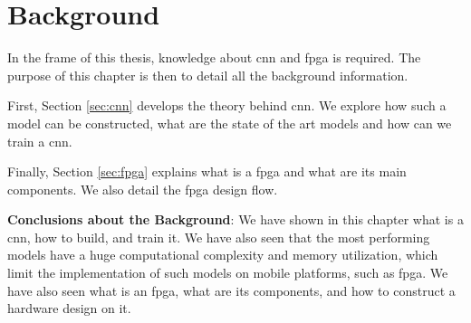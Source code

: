 \chapter{Background} \label{chap:background}
In the frame of this thesis, knowledge about \acrshort{cnn} and \acrshort{fpga} is required. The purpose of this chapter is then to detail all the background information.

First, Section \ref{sec:cnn} develops the theory behind \acrshort{cnn}. We explore how such a model can be constructed, what are the state of the art models and how can we train a \acrshort{cnn}.

Finally, Section \ref{sec:fpga} explains what is a \acrshort{fpga} and what are its main components. We also detail the \acrshort{fpga} design flow.


%
\begin{tcolorbox}
    \textbf{Conclusions about the Background}: \newline \newline
    We have shown in this chapter what is a \acrshort{cnn}, how to build, and train it. We have also seen that the most performing models have a huge computational complexity and memory utilization, which limit the implementation of such models on mobile platforms, such as \acrshort{fpga}. We have also seen what is an \acrshort{fpga}, what are its components, and how to construct a hardware design on it.
\end{tcolorbox}
% 
\afterpage{\blankpage}
\cleardoublepage
\newpage
